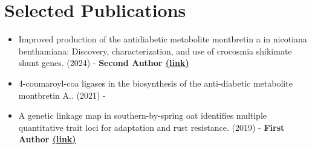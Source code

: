 \documentclass[letterpaper,11pt]{article}
\makeatletter
\newcommand{\customfullcite}[2][]{%
    \begingroup
    \@ifundefined{custommaxnames}{%
        \def\custommaxnames{1}%
    }{}%
    \ifblank{#1}{}{%
        \def\custommaxnames{#1}%
    }%
    \def\abx@field@labelnumber{\custommaxnames}%
    \fullcite{#2}%
    \endgroup
}
\makeatother
\begin{document}

\section*{Selected Publications}
\begin{itemize}[leftmargin=0.15in, label={}]
    \item{Improved production of the antidiabetic metabolite montbretin a in nicotiana
    benthamiana: Discovery, characterization, and use of crocosmia shikimate shunt genes. (2024) - {\textbf {Second Author {\href{https://onlinelibrary.wiley.com/doi/full/10.1111/tpj.16528}{\underline{(link)}}}}}}
    \item{4-coumaroyl-coa ligases in the biosynthesis of the anti-diabetic metabolite montbretin A.. (2021) - }
    \item{A genetic linkage map in southern-by-spring oat identifies multiple quantitative trait loci for adaptation and rust
    resistance. (2019) - {\textbf {First Author {\href{https://onlinelibrary.wiley.com/doi/abs/10.1111/pbr.12666}{\underline{(link)}}}}}}
\end{itemize}
\end{document}
